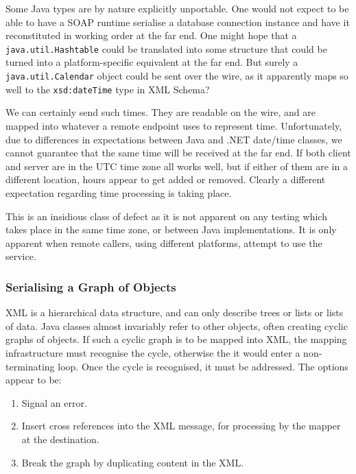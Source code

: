Some Java types are by nature explicitly unportable. One would not
expect to be able to have a SOAP runtime serialise a database
connection instance and have it reconstituted in working order at the
far end. One might hope that a {\tt java.util.Hashtable} could be
translated into some structure that could be turned into a
platform-specific equivalent at the far end. But surely a {\tt
java.util.Calendar} object could be sent over the wire, as it
apparently maps so well to the {\tt xsd:dateTime} type in XML Schema?

We can certainly send such times. They are readable on the wire, and
are mapped into whatever a remote endpoint uses to represent
time. Unfortunately, due to differences in expectations between Java
and .NET date/time classes, we cannot guarantee that the same time
will be received at the far end. If both client and server are in the
UTC time zone all works well, but if either of them are in a different
location, hours appear to get added or removed. Clearly a different
expectation regarding time processing is taking place.

This is an insidious class of defect as it is not apparent on any
testing which takes place in the same time zone, or between Java
implementations. It is only apparent when remote callers, using
different platforms, attempt to use the service.


\subsubsection{Serialising a Graph of Objects}
\label{objections:o-x:graphs}

XML is a hierarchical data structure, and can only describe trees or
lists or lists of data. Java classes almost invariably refer to other
objects, often creating cyclic graphs of objects. If such a cyclic
graph is to be mapped into XML, the mapping infrastructure must
recognise the cycle, otherwise the it would enter a non-terminating
loop. Once the cycle is recognised, it must be addressed. The options
appear to be:
\begin{enumerate}
\item Signal an error.
\item Insert cross references into the XML message, for processing by
the mapper at the destination. 
\item Break the graph by duplicating content in the XML.
\end{enumerate}


